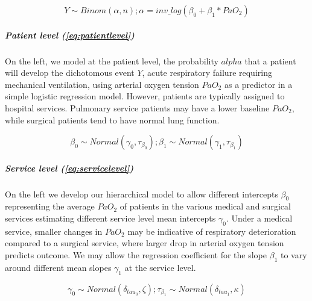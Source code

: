 \documentclass[11pt,notitlepage]{article}
\begin{document}
\begin{figure}
\vspace{-20pt}
 \begin{equation} \label{eq:patientlevel}
 Y \sim Binom (\alpha, n); \alpha = inv\_log (\beta_{0} +\beta_{1} * PaO_2)
 \end{equation}
\vspace{-25pt}
\end{figure}

\subparagraph*{Patient level (\ref{eq:patientlevel})}
On the left, we model at the patient level, the probability $alpha$ that a patient will develop the dichotomous event $Y$, acute respiratory failure requiring mechanical ventilation, using arterial oxygen tension $PaO_{2}$ as a predictor in a simple logistic regression model. However, patients are typically assigned to hospital services. Pulmonary service patients may have a lower baseline $PaO_2$, while surgical patients tend to have normal lung function. 

\begin{figure}
\vspace{-10pt}
\begin{equation} \label{eq:servicelevel}
 \beta_{0} \sim Normal (\gamma_0 , \tau_{\beta_0}); \beta_{1} \sim Normal (\gamma_1, \tau_{\beta_1})
\end{equation}
\vspace{-25pt}
\end{figure}

\subparagraph*{Service level (\ref{eq:servicelevel})}
On the left we develop our hierarchical model to allow different intercepts $\beta_{0}$ representing the average $PaO_2$ of patients in the various medical and surgical services estimating different service level mean intercepts $\gamma_0$. Under a medical service, smaller changes in $PaO_2$ may be indicative of respiratory deterioration compared to a surgical service, where larger drop in arterial oxygen tension predicts outcome. We may allow the regression coefficient for the slope $\beta_{1}$ to vary around different mean slopes $\gamma_1$ at the service level. 

\begin{figure}
\vspace{-10pt}
\begin{equation} \label{eq:hosptiallevel}
\gamma_0 \sim Normal (\delta_{tau_{0}}, \zeta); \tau_{\beta_1} \sim Normal(\delta_{tau_{1}}, \kappa) 
\end{equation}
\vspace{-25pt}
\end{figure}
\end{document}
